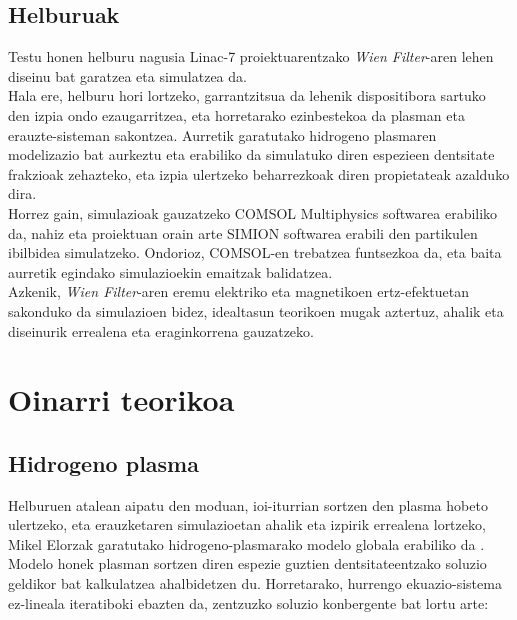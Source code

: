 \documentclass[12pt]{article}
\numberwithin{figure}{section}
\numberwithin{equation}{section}
\begin{document}
\subsection{Helburuak}

Testu honen helburu nagusia Linac-7 proiektuarentzako \textit{Wien Filter}-aren lehen diseinu bat garatzea eta simulatzea da.\\

Hala ere, helburu hori lortzeko, garrantzitsua da lehenik dispositibora sartuko den izpia ondo ezaugarritzea, eta horretarako ezinbestekoa da plasman eta erauzte-sisteman sakontzea. Aurretik garatutako hidrogeno plasmaren modelizazio bat aurkeztu eta erabiliko da \cite{elorza_romera_modelo_2022} simulatuko diren espezieen dentsitate frakzioak zehazteko, eta izpia ulertzeko beharrezkoak diren propietateak azalduko dira. \\

Horrez gain, simulazioak gauzatzeko COMSOL Multiphysics softwarea \cite{noauthor_comsol_2025} erabiliko da, nahiz eta proiektuan orain arte SIMION softwarea \cite{noauthor_simion_2020} erabili den partikulen ibilbidea simulatzeko. Ondorioz, COMSOL-en trebatzea funtsezkoa da, eta baita aurretik egindako simulazioekin emaitzak balidatzea.\\

Azkenik, \textit{Wien Filter}-aren eremu elektriko eta magnetikoen ertz-efektuetan sakonduko da simulazioen bidez, idealtasun teorikoen mugak aztertuz, ahalik eta diseinurik errealena eta eraginkorrena gauzatzeko.



\newpage
\section{Oinarri teorikoa}
\subsection{Hidrogeno plasma}
\label{sec:plasma}
Helburuen atalean aipatu den moduan, ioi-iturrian sortzen den plasma hobeto ulertzeko, eta erauzketaren simulazioetan ahalik eta izpirik errealena lortzeko, Mikel Elorzak garatutako hidrogeno-plasmarako modelo globala erabiliko da \cite{elorza_romera_modelo_2022}.\\

Modelo honek plasman sortzen diren espezie guztien dentsitateentzako soluzio geldikor bat kalkulatzea ahalbidetzen du. Horretarako, hurrengo ekuazio\hyp{}sistema ez-lineala iteratiboki ebazten da, zentzuzko soluzio konbergente bat lortu arte:
\end{document}
